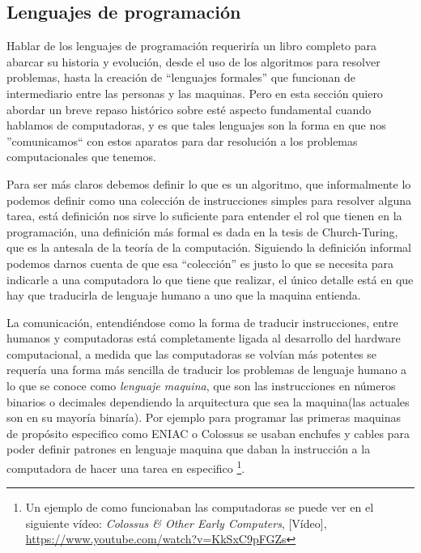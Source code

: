 \documentclass[letterpaper,12pt,oneside]{book}
\begin{document}
		
		\clearpage
		\subsection{Lenguajes de programación}
		
		Hablar de los lenguajes de programación requeriría un libro completo para abarcar su historia y evolución, desde el uso de los algoritmos
		para resolver problemas, hasta la creación de ``lenguajes formales'' que funcionan de intermediario entre las personas y las maquinas. Pero
		en esta sección quiero abordar un breve repaso histórico sobre esté aspecto fundamental cuando hablamos de computadoras, y es que tales lenguajes
		son la forma en que nos ''comunicamos`` con estos aparatos para dar resolución a los problemas computacionales que tenemos.
		
		Para ser más claros debemos definir lo que es un algoritmo, que informalmente lo podemos definir como una colección de instrucciones simples para
		resolver alguna tarea, está definición nos sirve lo suficiente para entender el rol que tienen en la programación, una definición más formal es
		dada en la tesis de Church-Turing, que es la antesala de la teoría de la computación\cite{sipser_introduction_2013}. Siguiendo la definición informal
		podemos darnos cuenta de que esa ``colección'' es justo lo que se necesita para indicarle a una computadora lo que tiene que realizar, el único
		detalle está en que hay que traducirla de lenguaje humano a uno que la maquina entienda.
		
		La comunicación, entendiéndose como la forma de traducir instrucciones, entre humanos y computadoras está		
		completamente ligada al desarrollo del hardware computacional, a medida que las computadoras se volvían más potentes se requería
		una forma más sencilla de traducir los problemas de lenguaje humano a lo que se conoce como \textit{lenguaje maquina}, que son las instrucciones en números
		binarios o decimales dependiendo la arquitectura que sea la maquina(las actuales son en su mayoría binaría). Por ejemplo para programar las primeras maquinas
		de propósito especifico como ENIAC o Colossus se usaban enchufes y cables para poder definir patrones en lenguaje maquina que daban la instrucción a la computadora de 	
		hacer una tarea en especifico\cite[p. 8]{tanenbaum_modern_2002} \footnote{Un ejemplo de como funcionaban las computadoras se puede ver en el siguiente vídeo: \emph{ 
		Colossus \& Other Early Computers}, [Vídeo], \url{https://www.youtube.com/watch?v=KkSxC9pFGZs} }. 
		
\end{document}
